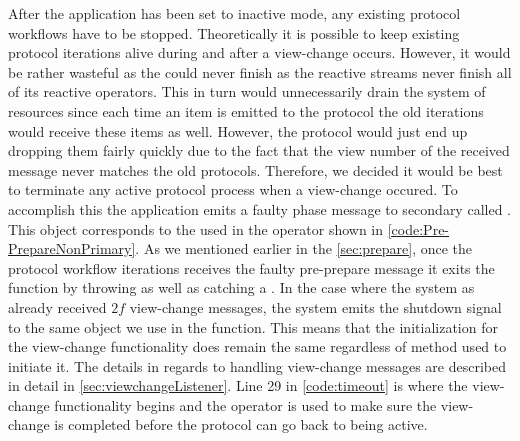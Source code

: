 After the application has been set to inactive mode, any existing protocol workflows have to be stopped. Theoretically it is possible to keep existing protocol iterations alive during and after a view-change occurs. However, it would be rather wasteful as the  could never finish as the reactive streams never finish all of its reactive operators.  This in turn would unnecessarily drain the system of resources since each time an item is emitted to the protocol  the old iterations would receive these items as well. However, the protocol would just end up dropping them fairly quickly due to the fact that the view number of the received message never matches the old protocols. Therefore, we decided it would be best to terminate any active protocol process when a view-change occured. To accomplish this the application emits a faulty phase message to secondary  called . This  object corresponds to the  used in the  operator shown in \autoref{code:Pre-PrepareNonPrimary}. As we mentioned earlier in the \autoref{sec:prepare}, once the protocol workflow iterations receives the faulty pre-prepare message it exits the function by throwing as well as catching a . In the case where the system as already received $2f$ view-change messages, the system emits the shutdown signal to the same   object we use in the   function. This means that the initialization for the view-change functionality does remain the same regardless of method used to initiate it. The details in regards to handling view-change messages are described in detail in  \autoref{sec:viewchangeListener}. Line 29 in \autoref{code:timeout} is where the view-change functionality begins and the  operator is used to make sure the view-change is completed before the protocol can go back to being active. 

